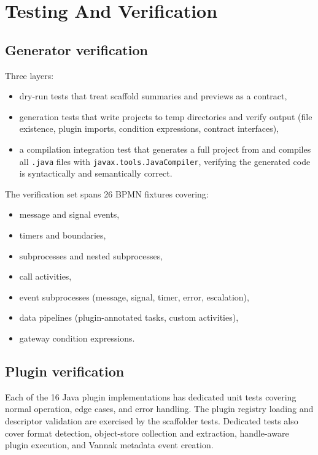\section{Testing And Verification}
\label{sec:TestingVerification}

\subsection{Generator verification}

Three layers:
\begin{itemize}
\item dry-run tests that treat scaffold summaries and previews as a contract,
\item generation tests that write projects to temp directories and verify output
  (file existence, plugin imports, condition expressions, contract interfaces),
\item a compilation integration test that generates a full project from
   and compiles all \texttt{.java} files with
  \texttt{javax.tools.JavaCompiler}, verifying the generated code is
  syntactically and semantically correct.
\end{itemize}

The verification set spans 26 BPMN fixtures covering:
\begin{itemize}
\item message and signal events,
\item timers and boundaries,
\item subprocesses and nested subprocesses,
\item call activities,
\item event subprocesses (message, signal, timer, error, escalation),
\item data pipelines (plugin-annotated tasks, custom activities),
\item gateway condition expressions.
\end{itemize}

\subsection{Plugin verification}

Each of the 16 Java plugin implementations has dedicated unit tests
covering normal operation, edge cases, and error handling. The plugin
registry loading and descriptor validation are exercised by the scaffolder
tests. Dedicated tests also cover format detection, object-store collection and
extraction, handle-aware plugin execution, and Vannak metadata event creation.

